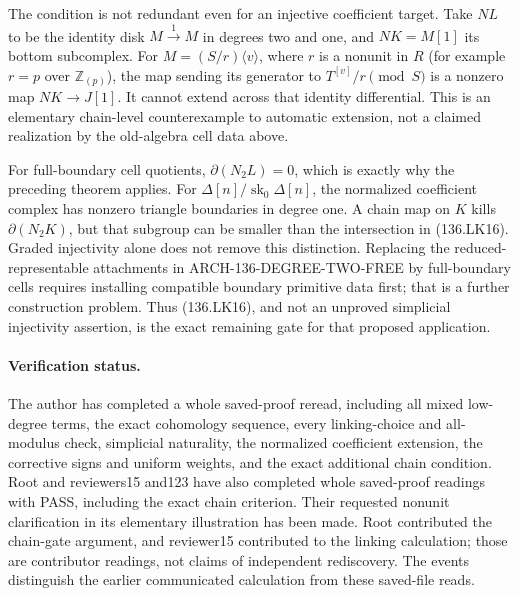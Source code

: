 The condition is not redundant even for an injective coefficient
target.  Take \(NL\) to be the identity disk
\(M\xrightarrow{1}M\) in degrees two and one, and
\(NK=M[1]\) its bottom subcomplex.  For
\(M=(S/r)\langle v\rangle\), where \(r\) is a nonunit
in \(R\) (for example \(r=p\) over \(\mathbb Z_{(p)}\)),
the map sending its generator
to \(T^{[v]}/r\pmod S\) is a nonzero map \(NK\to J[1]\).
It cannot extend across that identity differential.  This is
an elementary chain-level counterexample to automatic extension,
not a claimed realization by the old-algebra cell data above.

For full-boundary cell quotients, \(\partial(N_2L)=0\),
which is exactly why the preceding theorem applies.  For
\(\Delta[n]/\operatorname{sk}_0\Delta[n]\), the
normalized coefficient complex has nonzero triangle boundaries
in degree one.  A chain map on \(K\) kills
\(\partial(N_2K)\), but that subgroup can be smaller than
the intersection in (136.LK16).  Graded injectivity alone does
not remove this distinction.  Replacing the reduced-representable
attachments in ARCH-136-DEGREE-TWO-FREE by full-boundary cells
requires installing compatible boundary primitive data first;
that is a further construction problem.  Thus (136.LK16), and
not an unproved simplicial injectivity assertion, is the exact
remaining gate for that proposed application.

\paragraph{Verification status.}
The author has completed a whole saved-proof reread, including
all mixed low-degree terms, the exact cohomology sequence,
every linking-choice and all-modulus check, simplicial naturality,
the normalized coefficient extension, the corrective signs and
uniform weights, and the exact additional chain condition.
Root and reviewers15 and123 have also completed whole saved-proof
readings with PASS, including the exact chain criterion.  Their
requested nonunit clarification in its elementary illustration
has been made.  Root
contributed the chain-gate argument, and reviewer15 contributed
to the linking calculation; those are contributor readings,
not claims of independent rediscovery.  The events distinguish
the earlier communicated calculation from these saved-file reads.
